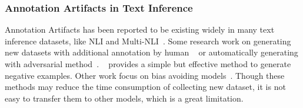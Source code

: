 \subsubsection*{Annotation Artifacts in Text Inference}
Annotation Artifacts has been reported to be existing widely in many text 
inference datasets, like NLI and Multi-NLI~\cite{gururangan2018annotation}.
Some research work on generating new datasets with additional annotation by human
~\cite{sharma2018tackling} or automatically generating with adversarial method~\cite{zellers2018swag}. 
~\cite{roemmele2017rnn} provides a simple but effective method to generate negative examples. 
Other work focus on bias avoiding models~\cite{clark2019don}. Though these methods 
may reduce the time consumption of collecting new dataset, it is not easy to transfer them to other models, which 
is a great limitation.






